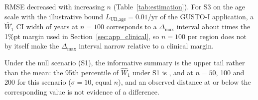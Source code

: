 \documentclass[AMA,Times1COL]{WileyNJDv5}
\begin{document}
RMSE decreased with increasing $n$ (Table~\ref{tab:estimation}). For S3 on the age scale with the illustrative bound $L_{\text{UB,age}} = 0.01$/yr of the GUSTO-I application, a $\widehat{W}_1$ CI width of  years at $n = 100$ corresponds to a $\Delta_{\max}$ interval about  times the 1\%pt margin used in Section~\ref{sec:app_clinical}, so $n = 100$ per region does not by itself make the $\Delta_{\max}$ interval narrow relative to a clinical margin.

Under the null scenario (S1), the informative summary is the upper tail rather than the mean: the 95th percentile of $\widehat{W}_1$ under S1 is ,  and  at $n = 50$, 100 and 200 for this scenario ($\sigma = 10$, equal $n$), and an observed distance at or below the corresponding value is not evidence of a difference.
\end{document}
